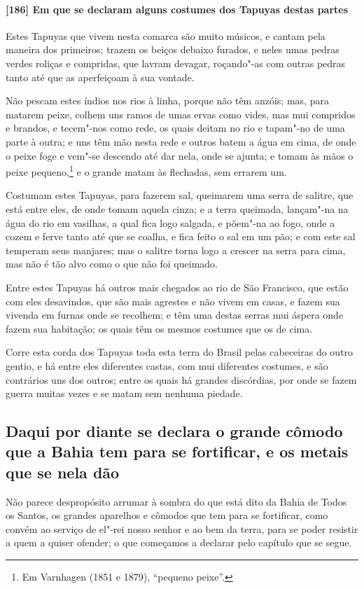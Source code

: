 \paragraph{[186] Em que se declaram alguns costumes dos Tapuyas destas partes}\quad
Estes Tapuyas que vivem nesta comarca são muito músicos, e cantam pela maneira dos
primeiros; trazem os beiços debaixo furados, e neles umas pedras verdes roliças e
compridas, que lavram devagar, roçando"-as com outras pedras tanto até que as aperfeiçoam à
sua vontade.

Não pescam estes índios nos rios à linha, porque não têm anzóis; mas, para matarem peixe,
colhem uns ramos de umas ervas como vides, mas mui compridos e brandos, e tecem"-nos como
rede, os quais deitam no rio e tapam"-no de uma parte à outra; e uns têm mão nesta rede e
outros batem a água em cima, de onde o peixe foge e vem"-se descendo até dar nela, onde se
ajunta; e tomam às mãos o peixe pequeno,\footnote{ Em Varnhagen (1851 e 1879), ``pequeno
peixe''.} e o grande matam às flechadas, sem errarem um.

Costumam estes Tapuyas, para fazerem sal, queimarem uma serra de salitre, que está entre
eles, de onde tomam aquela cinza; e a terra queimada, lançam"-na na água do rio em
vasilhas, a qual fica logo salgada, e põem"-na ao fogo, onde a cozem e ferve tanto até que
se coalha, e fica feito o sal em um pão; e com este sal temperam seus manjares; mas o
salitre torna logo a crescer na serra para cima, mas não é tão alvo como o que não foi
queimado.

Entre estes Tapuyas há outros mais chegados ao rio de São Francisco, que estão com eles
desavindos, que são mais agrestes e não vivem em casas, e fazem sua vivenda em furnas onde
se recolhem; e têm uma destas serras mui áspera onde fazem sua habitação; os quais têm os
mesmos costumes que os de cima.

Corre esta corda dos Tapuyas toda esta terra do Brasil pelas cabeceiras do outro gentio, e
há entre eles diferentes castas, com mui diferentes costumes, e são contrários uns dos
outros; entre os quais há grandes discórdias, por onde se fazem guerra muitas vezes e se
matam sem nenhuma piedade.

\subsection{Daqui por diante se declara o grande cômodo que a Bahia tem para se
fortificar, e os metais que se nela dão}

Não parece despropósito arrumar à sombra do que está dito da Bahia de Todos os Santos, os
grandes aparelhos e cômodos que tem para se fortificar, como convém ao serviço de el"-rei
nosso senhor e ao bem da terra, para se poder resistir a quem a quiser ofender; o que
começamos a declarar pelo capítulo que se segue.

